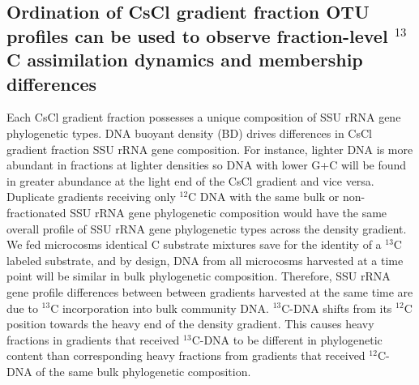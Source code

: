 \subsection{Ordination of CsCl gradient fraction OTU profiles can be used to
observe fraction-level $^{13}$C assimilation dynamics and membership differences}
Each CsCl gradient fraction possesses a unique composition of SSU rRNA gene
phylogenetic types. DNA buoyant density (BD) drives differences in CsCl
gradient fraction SSU rRNA gene composition. For
instance, lighter DNA is more abundant in fractions at lighter densities so
DNA with lower G+C will be found in greater abundance at the light end of the
CsCl gradient and vice versa.  Duplicate gradients receiving only $^{12}$C DNA
with the same bulk or non-fractionated SSU rRNA gene phylogenetic composition 
would have the same overall profile of SSU rRNA gene phylogenetic types across 
the density gradient. We fed microcosms identical C substrate mixtures save 
for the identity of a $^{13}$C labeled substrate, and by design, DNA from all 
microcosms harvested at a time point will be similar in bulk phylogenetic 
composition. Therefore, SSU rRNA gene profile differences between between gradients 
harvested at the same time are due to $^{13}$C incorporation into bulk community DNA. 
$^{13}$C-DNA shifts from its $^{12}$C position towards the heavy end of the density gradient. This causes heavy fractions in gradients that received $^{13}$C-DNA to be different in
phylogenetic content than corresponding heavy fractions from gradients that
received $^{12}$C-DNA of the same bulk phylogenetic composition.

